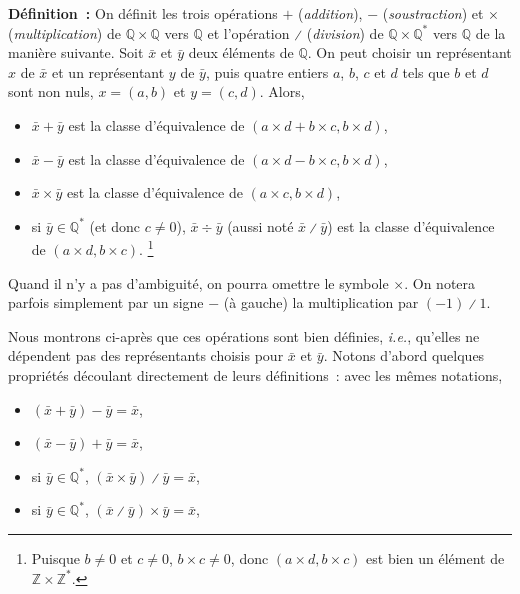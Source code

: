 \noindent\textbf{Définition :} On définit les trois opérations $+$ (\emph{addition}), $-$ (\emph{soustraction}) et $\times$ (\emph{multiplication}) de $\mathbb{Q} \times \mathbb{Q}$ vers $\mathbb{Q}$ et l'opération $\divslash$ (\emph{division}) de $\mathbb{Q} \times \mathbb{Q}^*$ vers $\mathbb{Q}$ de la manière suivante.  
Soit $\bar{x}$ et $\bar{y}$ deux éléments de $\mathbb{Q}$. 
On peut choisir un représentant $x$ de $\bar{x}$ et un représentant $y$ de $\bar{y}$, puis quatre entiers $a$, $b$, $c$ et $d$ tels que $b$ et $d$ sont non nuls, $x = (a, b)$ et $y = (c, d)$.
Alors, 
\begin{itemize}[nosep]
    \item \sindex[isy]{$+$} $\bar{x} + \bar{y}$ est la classe d'équivalence de $(a \times d + b \times c, b \times d)$,
    \item \sindex[isy]{$-$} $\bar{x} - \bar{y}$ est la classe d'équivalence de $(a \times d - b \times c, b \times d)$,
    \item \sindex[isy]{$\times$} $\bar{x} \times \bar{y}$ est la classe d'équivalence de $(a \times c, b \times d)$,
    \item \sindex[isy]{$\div$}\sindex[isy]{$\divslash$} si $\bar{y} \in \mathbb{Q}^*$ (et donc $c \neq 0$), $\bar{x} \div \bar{y}$ (aussi noté $\bar{x} \divslash \bar{y}$) est la classe d'équivalence de $(a \times d, b \times c)$.%
        \footnote{Puisque $b \neq 0$ et $c \neq 0$, $b \times c \neq 0$, donc $(a \times d, b \times c)$ est bien un élément de $\mathbb{Z} \times \mathbb{Z}^*$.}
\end{itemize}
Quand il n'y a pas d'ambiguité, on pourra omettre le symbole $\times$. 
On notera parfois simplement par un signe $-$ (à gauche) la multiplication par $(-1) \divslash 1$.

\medskip

Nous montrons ci-après que ces opérations sont bien définies, \emph{i.e.}, qu'elles ne dépendent pas des représentants choisis pour $\bar{x}$ et $\bar{y}$.
Notons d'abord quelques propriétés découlant directement de leurs définitions : avec les mêmes notations, 
\begin{itemize}[nosep]
    \item $(\bar{x} + \bar{y}) - \bar{y} = \bar{x}$,
    \item $(\bar{x} - \bar{y}) + \bar{y} = \bar{x}$,
    \item si $\bar{y} \in \mathbb{Q}^*$, $(\bar{x} \times \bar{y}) \divslash \bar{y} = \bar{x}$,
    \item si $\bar{y} \in \mathbb{Q}^*$, $(\bar{x} \divslash \bar{y}) \times \bar{y} = \bar{x}$,
\end{itemize}

